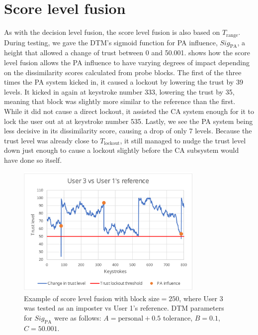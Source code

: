 \section{Score level fusion}
\label{sec:analysis-score-lvl}
As with the decision level fusion, the score level fusion is also based on $T_{\text{range}}$.
During testing, we gave the DTM's sigmoid function for PA influence, $\textit{Sig}_{\text{PA}}$, a height that allowed a change of trust between 0 and 50.001.
 shows how the score level fusion allows the PA influence to have varying degrees of impact depending on the dissimilarity scores calculated from probe blocks.
The first of the three times the PA system kicked in, it caused a lockout by lowering the trust by 39 levels.
It kicked in again at keystroke number 333, lowering the trust by 35, meaning that block was slightly more similar to the reference than the first.
While it did not cause a direct lockout, it assisted the CA system enough for it to lock the user out at at keystroke number 535.
Lastly, we see the PA system being less decisive in its dissimilarity score, causing a drop of only 7 levels.
Because the trust level was already close to $T_{\text{lockout}}$, it still managed to nudge the trust level down just enough to cause a lockout slightly before the CA subsystem would have done so itself.

\begin{figure}[ht]
    \centering
    \includegraphics[width=0.8\textwidth]{figures/trustProgressScoreLevel.pdf}
    \caption{Example of score level fusion with $\text{block size} = 250$, where User 3 was tested as an imposter vs User 1's reference. DTM parameters for $\textit{Sig}_{\text{PA}}$ were as follows: $A = \text{personal} + 0.5 \text{ tolerance}$, $B = 0.1$, $C = 50.001$.}
    \label{fig:trustProgressScoreLevel}
\end{figure}

